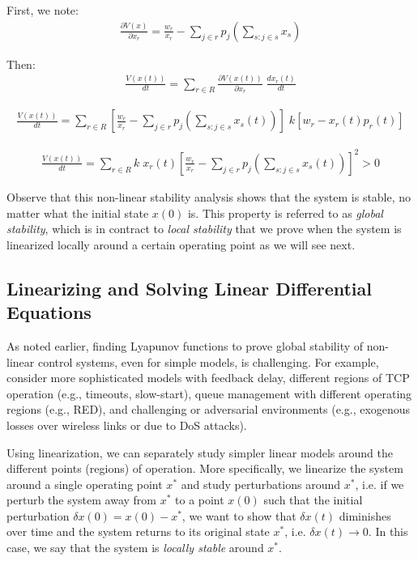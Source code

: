 \documentclass{article}
\begin{document}
First, we note:
\begin{eqnarray*}
\frac{\partial V(x)}{\partial x_r} = \frac{w_r}{x_r} - \sum_{j \in r} p_j(\sum_{s: j \in s} x_s)
\end{eqnarray*}

Then:
\begin{eqnarray*}
\frac{V(x(t))}{dt} = \sum_{r \in R} \frac{\partial V(x(t))}{\partial x_r} \; \frac{d x_r(t)}{dt}
\end{eqnarray*}

\begin{eqnarray*}
\frac{V(x(t))}{dt} = \sum_{r \in R} [\frac{w_r}{x_r} - \sum_{j \in r} p_j(\sum_{s: j \in s} x_s(t))] \; k [w_r - x_r(t) p_r(t)]
\end{eqnarray*}

\begin{eqnarray*}
\frac{V(x(t))}{dt} = \sum_{r \in R} k \;x_r(t) [\frac{w_r}{x_r} - \sum_{j \in r} p_j(\sum_{s: j \in s} x_s(t))]^2 > 0
\end{eqnarray*}

Observe that this non-linear stability analysis shows that the system is stable, no matter what 
the initial state $x(0)$ is. This property is referred to as {\em global stability},
which is in contract to {\em local stability} that we prove when the system is linearized locally
around a certain operating point as we will see next.  

\subsection{Linearizing and Solving Linear Differential Equations}

As noted earlier, finding Lyapunov functions to prove global stability of non-linear control systems,
even for simple models, is challenging. For example, consider more sophisticated models
with feedback delay, different regions of TCP operation (e.g., timeouts, slow-start),
queue management with different operating regions (e.g., RED), and
challenging or adversarial environments (e.g., exogenous losses over wireless links or due to DoS attacks).

Using linearization, we can separately study simpler linear models around the different points (regions)
of operation. More specifically, we linearize the system around a single operating point $x^*$ and
study perturbations around $x^*$, i.e. if we perturb the system away from $x^*$ to a point $x(0)$ such that the initial perturbation $\delta x(0) = x(0) - x^*$, we want to show that $\delta x(t)$ diminishes over time and the system returns to its original state $x^*$, i.e. $\delta x(t) \rightarrow 0$. In this case, we say that the system is {\em locally stable} around $x^*$.
\end{document}
